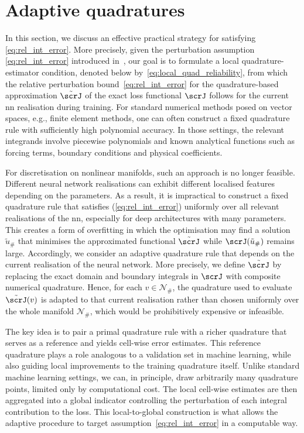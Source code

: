 \documentclass[oneside,reqno,11pt,a4paper]{amsart}
\theoremstyle{definition}
\begin{document}
\section{Adaptive quadratures}\label{sec:adaptive-quad}

In this section, we discuss an effective practical strategy for satisfying
\eqref{eq:rel_int_error}. More precisely, given the perturbation assumption
\eqref{eq:rel_int_error} introduced in~,
our goal is to formulate a local quadrature-estimator condition, denoted below
by~\eqref{eq:local_quad_reliability}, from which the relative perturbation
bound~\eqref{eq:rel_int_error} for the quadrature-based approximation
$\tilde{\scrJ}$ of the exact loss functional $\scrJ$ follows for the current
\ac{nn} realisation during training. For standard numerical methods
posed on vector spaces, e.g., finite element methods, one can often construct a
fixed quadrature rule with sufficiently high polynomial accuracy. In those
settings, the relevant integrands involve piecewise polynomials and known
analytical functions such as forcing terms, boundary conditions and physical
coefficients.

For discretisation on nonlinear manifolds, such an approach is no longer
feasible. Different neural network realisations can exhibit different
localised features depending on the parameters. As a result, it is
impractical to construct a fixed quadrature rule that satisfies
(\ref{eq:rel_int_error}) uniformly over all relevant realisations of the
\ac{nn}, especially for deep architectures with many parameters. This
creates a form of overfitting in which the optimisation may find a solution
$\tilde{u}_{\#}$ that minimises the approximated functional $\tilde \scrJ$
while $\scrJ(\tilde{u}_{\#})$ remains large. Accordingly, we consider an
adaptive quadrature rule that depends on the current realisation of the neural
network. More precisely, we define
$\tilde{\scrJ}$ by replacing the exact domain and boundary integrals in
$\scrJ$ with composite numerical quadrature. Hence, for each
$v \in \mathcal{N}_{\#}$, the quadrature used to evaluate $\tilde{\scrJ}(v)$
is adapted to that current realisation rather than chosen uniformly over the
whole manifold $\mathcal{N}_{\#}$, which would be prohibitively expensive or infeasible.

The key idea is to pair a primal quadrature rule with a richer quadrature that
serves as a reference and yields cell-wise error estimates. This reference
quadrature plays a role analogous to a validation set in machine learning,
while also guiding local improvements to the training quadrature itself.
Unlike standard machine learning settings, we can, in principle, draw
arbitrarily many quadrature points, limited only by computational cost.
The local cell-wise estimates are then aggregated into a global
indicator controlling the perturbation of each integral contribution to the
loss. This local-to-global construction is what allows the adaptive procedure
to target assumption~\eqref{eq:rel_int_error} in a computable way.
\end{document}
